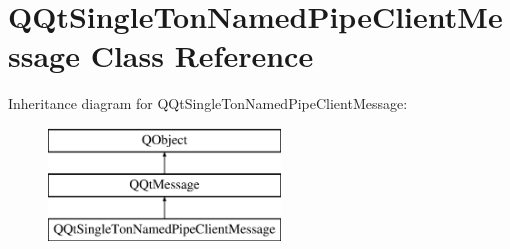 \hypertarget{class_q_qt_single_ton_named_pipe_client_message}{}\section{Q\+Qt\+Single\+Ton\+Named\+Pipe\+Client\+Message Class Reference}
\label{class_q_qt_single_ton_named_pipe_client_message}
Inheritance diagram for Q\+Qt\+Single\+Ton\+Named\+Pipe\+Client\+Message\+:\begin{figure}[H]
\begin{center}
\leavevmode
\includegraphics[height=3.000000cm]{class_q_qt_single_ton_named_pipe_client_message}
\end{center}
\end{figure}

